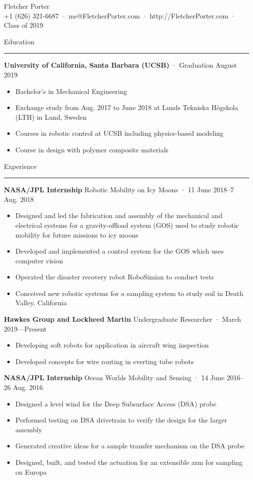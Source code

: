 \documentclass[12pt, oneside]{article}
\newcommand{\titlestyle}[1] {
	{\fontsize{50pt}{1em}\selectfont \textcolor{new_red}{\textsf{#1}}} \\
}
\newcommand{\headingstyleJobs}[1] {
	{\fontsize{19pt}{1em}\selectfont \textcolor{new_red}{\textsf{#1}}}
	\textcolor{new_red}{\rule{3.25in}{0.5pt}} \vspace{3pt}
}
\newcommand{\infostyle}[1] {
	{\fontsize{9pt}{1em}\selectfont #1} \\ \vspace{10pt}
}
\newcommand{\jobtitle}[3] {
	{\bf #1} {#2} · {#3} \vspace{-10pt} \\
}
\begin{document}
\begin{flushleft}



\titlestyle{Fletcher Porter}
\infostyle{+1 (626) 321-6687 · me@FletcherPorter.com · http://FletcherPorter.com · Class of 2019}


\headingstyleJobs{Education}

\jobtitle{University of California, Santa Barbara (UCSB)}{}{Graduation August 2019}
\begin{itemize}
	\item Bachelor's in Mechanical Engineering
	\item Exchange study from Aug. 2017 to June 2018 at Lunds Tekniska Högskola (LTH) in Lund, Sweden
	\item Courses in robotic control at UCSB including physics-based modeling
	\item Course in design with polymer composite materials
\end{itemize}


\headingstyleJobs{Experience}

\jobtitle{NASA/JPL Internship}{Robotic Mobility on Icy Moons}{11 June 2018–7 Aug. 2018}
\begin{itemize}
	\item Designed and led the fabrication and assembly of the mechanical and electrical systems for a gravity-offload system (GOS)  used to study robotic mobility for future missions to icy moons
	\item Developed and implemented a control system for the GOS which uses computer vision
	\item Operated the disaster recovery robot RoboSimian to conduct tests
	\item Conceived new robotic systems for a sampling system to study soil in Death Valley, California
\end{itemize}

\jobtitle{Hawkes Group and Lockheed Martin}{Undergraduate Researcher}{March 2019—Present}
\begin{itemize}
	\item Developing soft robots for application in aircraft wing inspection
	\item Developed concepts for wire routing in everting tube robots
\end{itemize}

\jobtitle{NASA/JPL Internship}{Ocean Worlds Mobility and Sensing}{14 June 2016–26 Aug. 2016}
\def\HrefFont{\em}
\begin{itemize}
	\item Designed a level wind for the Deep Subsurface Access (DSA) probe
	\item Performed testing on DSA drivetrain to verify the design for the larger assembly
	\item Generated creative ideas for a sample transfer mechanism on the DSA probe
	\item Designed, built, and tested the actuation for an extensible arm for sampling on Europa
\end{itemize}


\end{flushleft}
\end{document}
